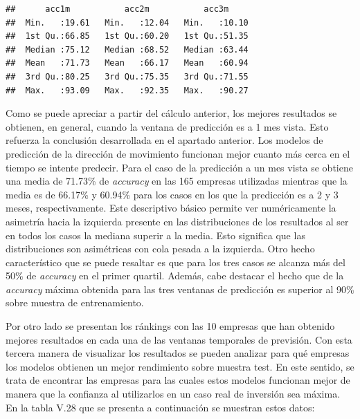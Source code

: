 \documentclass[]{DissertateUSU}
\begin{document}
\begin{verbatim}
##      acc1m           acc2m           acc3m      
##  Min.   :19.61   Min.   :12.04   Min.   :10.10  
##  1st Qu.:66.85   1st Qu.:60.20   1st Qu.:51.35  
##  Median :75.12   Median :68.52   Median :63.44  
##  Mean   :71.73   Mean   :66.17   Mean   :60.94  
##  3rd Qu.:80.25   3rd Qu.:75.35   3rd Qu.:71.55  
##  Max.   :93.09   Max.   :92.35   Max.   :90.27
\end{verbatim}

\noindent Como se puede apreciar a partir del cálculo anterior, los
mejores resultados se obtienen, en general, cuando la ventana de
predicción es a 1 mes vista. Esto refuerza la conclusión desarrollada en
el apartado anterior. Los modelos de predicción de la dirección de
movimiento funcionan mejor cuanto más cerca en el tiempo se intente
predecir. Para el caso de la predicción a un mes vista se obtiene una
media de 71.73\% de \emph{accuracy} en las 165 empresas utilizadas
mientras que la media es de 66.17\% y 60.94\% para los casos en los que
la predicción es a 2 y 3 meses, respectivamente. Este descriptivo básico
permite ver numéricamente la asimetría hacia la izquierda presente en
las distribuciones de los resultados al ser en todos los casos la
mediana superir a la media. Esto significa que las distribuciones son
asimétricas con cola pesada a la izquierda. Otro hecho característico
que se puede resaltar es que para los tres casos se alcanza más del 50\%
de \emph{accuracy} en el primer quartil. Además, cabe destacar el hecho
que de la \emph{accuracy} máxima obtenida para las tres ventanas de
predicción es superior al 90\% sobre muestra de entrenamiento.

\noindent Por otro lado se presentan los ránkings con las 10 empresas
que han obtenido mejores resultados en cada una de las ventanas
temporales de previsión. Con esta tercera manera de visualizar los
resultados se pueden analizar para qué empresas los modelos obtienen un
mejor rendimiento sobre muestra test. En este sentido, se trata de
encontrar las empresas para las cuales estos modelos funcionan mejor de
manera que la confianza al utilizarlos en un caso real de inversión sea
máxima. En la tabla V.28 que se presenta a continuación se muestran
estos datos:
\end{document}

